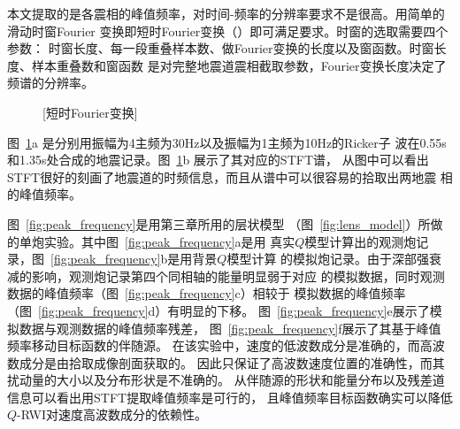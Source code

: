 本文提取的是各震相的峰值频率，对时间-频率的分辨率要求不是很高。用简单的滑动时窗Fourier
变换即短时Fourier变换（）即可满足要求。时窗的选取需要四个参数：
时窗长度、每一段重叠样本数、做Fourier变换的长度以及窗函数。时窗长度、样本重叠数和窗函数
是对完整地震道震相截取参数，Fourier变换长度决定了频谱的分辨率。

\begin{figure}[!htbp]
    \centering
    [短时Fourier变换]
    \label{fig:stft_effect}
\end{figure}
图~\ref{fig:stft_effect}a 是分别用振幅为4主频为30Hz以及振幅为1主频为10Hz的Ricker子
波在0.55s和1.35s处合成的地震记录。图~\ref{fig:stft_effect}b 展示了其对应的STFT谱，
从图中可以看出STFT很好的刻画了地震道的时频信息，而且从谱中可以很容易的拾取出两地震
相的峰值频率。

图~\ref{fig:peak_frequency}是用第三章所用的层状模型
（图~\ref{fig:lens_model}）所做的单炮实验。其中图~\ref{fig:peak_frequency}a是用
真实$Q$模型计算出的观测炮记录，图~\ref{fig:peak_frequency}b是用背景$Q$模型计算
的模拟炮记录。由于深部强衰减的影响，观测炮记录第四个同相轴的能量明显弱于对应
的模拟数据，同时观测数据的峰值频率（图~\ref{fig:peak_frequency}c）相较于
模拟数据的峰值频率（图~\ref{fig:peak_frequency}d）有明显的下移。
图~\ref{fig:peak_frequency}e展示了模拟数据与观测数据的峰值频率残差，
图~\ref{fig:peak_frequency}f展示了其基于峰值频率移动目标函数的伴随源。
在该实验中，速度的低波数成分是准确的，而高波数成分是由拾取成像剖面获取的。
因此只保证了高波数速度位置的准确性，而其扰动量的大小以及分布形状是不准确的。
从伴随源的形状和能量分布以及残差道信息可以看出用STFT提取峰值频率是可行的，
且峰值频率目标函数确实可以降低$Q$-RWI对速度高波数成分的依赖性。

